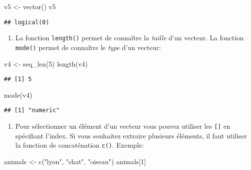 \documentclass[
]{article}
\newenvironment{Shaded}{\begin{snugshade}}{\end{snugshade}}
\newcommand{\DecValTok}[1]{\textcolor[rgb]{0.00,0.00,0.81}{#1}}
\newcommand{\FunctionTok}[1]{\textcolor[rgb]{0.00,0.00,0.00}{#1}}
\newcommand{\NormalTok}[1]{#1}
\newcommand{\OtherTok}[1]{\textcolor[rgb]{0.56,0.35,0.01}{#1}}
\newcommand{\StringTok}[1]{\textcolor[rgb]{0.31,0.60,0.02}{#1}}
\providecommand{\tightlist}{%
  \setlength{\itemsep}{0pt}\setlength{\parskip}{0pt}}
\begin{document}
\begin{Shaded}
\begin{Highlighting}[]
\NormalTok{v5 }\OtherTok{\textless{}{-}} \FunctionTok{vector}\NormalTok{()}
\NormalTok{v5}
\end{Highlighting}
\end{Shaded}

\begin{verbatim}
## logical(0)
\end{verbatim}

\begin{enumerate}
\def\labelenumi{\arabic{enumi}.}
\setcounter{enumi}{5}
\tightlist
\item
  La fonction \texttt{length()} permet de connaître la \emph{taille} d'un vecteur. La fonction \texttt{mode()} permet de connaître le \emph{type} d'un vecteur:
\end{enumerate}

\begin{Shaded}
\begin{Highlighting}[]
\NormalTok{v4 }\OtherTok{\textless{}{-}} \FunctionTok{seq\_len}\NormalTok{(}\DecValTok{5}\NormalTok{)}
\FunctionTok{length}\NormalTok{(v4)}
\end{Highlighting}
\end{Shaded}

\begin{verbatim}
## [1] 5
\end{verbatim}

\begin{Shaded}
\begin{Highlighting}[]
\FunctionTok{mode}\NormalTok{(v4)}
\end{Highlighting}
\end{Shaded}

\begin{verbatim}
## [1] "numeric"
\end{verbatim}

\begin{enumerate}
\def\labelenumi{\arabic{enumi}.}
\setcounter{enumi}{6}
\tightlist
\item
  Pour sélectionner un élément d'un vecteur vous pouvez utiliser les \texttt{{[}{]}} en spécifiant l'index. Si vous souhaitez extraire plusieurs éléments, il faut utiliser la fonction de concaténation \texttt{c()}. Exemple:
\end{enumerate}

\begin{Shaded}
\begin{Highlighting}[]
\NormalTok{animals }\OtherTok{\textless{}{-}} \FunctionTok{c}\NormalTok{(}\StringTok{"lyon"}\NormalTok{, }\StringTok{"chat"}\NormalTok{, }\StringTok{"oiseau"}\NormalTok{)}
\NormalTok{animals[}\DecValTok{1}\NormalTok{]}
\end{Highlighting}
\end{Shaded}
\end{document}
